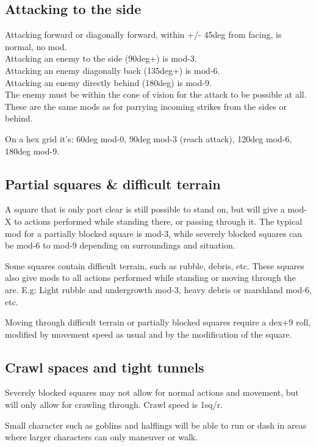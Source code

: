 \subsection*{Attacking to the side}
Attacking forward or diagonally forward, within +/- 45deg from facing, is normal, no mod. \\
Attacking an enemy to the side (90deg+) is mod-3. \\
Attacking an enemy diagonally back (135deg+) is mod-6. \\
Attacking an enemy directly behind (180deg) is mod-9. \\
The enemy must be within the cone of vision for the attack to be possible at all. \\
These are the same mods as for parrying incoming strikes from the sides or behind.

On a hex grid it's: 60deg mod-0, 90deg mod-3 (reach attack), 120deg mod-6, 180deg mod-9.


\subsection*{Partial squares \& difficult terrain}
A square that is only part clear is still possible to stand on, but will give a mod-X to actions performed while standing there, or passing through it. The typical mod for a partially blocked square is mod-3, while severely blocked squares can be mod-6 to mod-9 depending on surroundings and situation.

Some squares contain difficult terrain, such as rubble, debris, etc. These squares also give mods to all actions performed while standing or moving through the are. E.g: Light rubble and undergrowth mod-3, heavy debris or marshland mod-6, etc.

Moving through difficult terrain or partially blocked squares require a dex+9 roll, modified by movement speed as usual and by the modification of the square.


\subsection*{Crawl spaces and tight tunnels}
Severely blocked squares may not allow for normal actions and movement, but will only allow for crawling through. Crawl speed is 1sq/r.

Small character such as goblins and halflings will be able to run or dash in areas where larger characters can only maneuver or walk.

